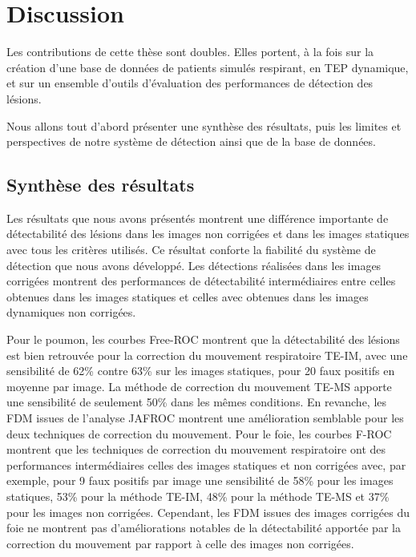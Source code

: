 \chapter{Discussion}

Les contributions de cette thèse sont doubles. Elles portent, à la fois sur la
création d'une base de données de patients simulés respirant, en TEP dynamique, et
sur un ensemble d'outils d'évaluation des performances de détection
des lésions.  
 
Nous allons tout d'abord présenter une synthèse des résultats, puis les limites et perspectives de notre système de détection ainsi que de la base de données.

\section{Synthèse des résultats}

Les résultats que nous avons présentés montrent une différence importante de
détectabilité des lésions dans les images non corrigées et dans les images statiques
avec tous les critères utilisés. Ce résultat conforte la fiabilité du système de
détection que nous avons développé. Les détections réalisées dans les images
corrigées montrent des performances de détectabilité intermédiaires entre celles obtenues dans les images statiques et celles avec obtenues dans les images dynamiques non corrigées. 

Pour le poumon, les courbes Free-ROC montrent que la détectabilité des
lésions est bien retrouvée pour la correction du mouvement respiratoire TE-IM, avec une sensibilité de 62\% contre 63\% sur les images statiques, pour
20 faux positifs en moyenne par image. La méthode de correction du mouvement TE-MS apporte une sensibilité de seulement 50\% dans les mêmes conditions. En revanche, les FDM
issues de l'analyse JAFROC montrent une amélioration semblable pour
les deux techniques de correction du mouvement. Pour le foie, les courbes F-ROC
montrent que les techniques de correction du mouvement respiratoire ont des performances intermédiaires celles des images statiques et non
corrigées avec, par exemple, pour 9 faux positifs par image une sensibilité de
58\% pour les images statiques, 53\% pour la méthode TE-IM, 48\% pour la méthode TE-MS et 37\% pour
les images non corrigées. Cependant, les FDM issues des images corrigées du foie
ne montrent pas d'améliorations notables de la détectabilité apportée par la
correction du mouvement par rapport à celle des images non corrigées. 


